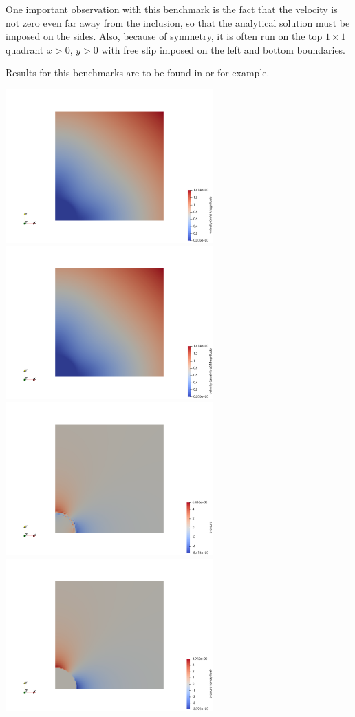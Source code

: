\documentclass[a4paper]{article}
\begin{document}
One important observation with this benchmark is the fact that the velocity is not zero even far 
away from the inclusion, so that the analytical solution must be imposed on the sides.
Also, because of symmetry, it is often run on the top $1\times 1$ quadrant $x>0$, $y>0$ with 
free slip imposed on the left and bottom boundaries.

Results for this benchmarks are to be found in \textcite{krhb12} or \textcite{gemd13} 
for example. 

\begin{center}
\includegraphics[width=8cm]{./results/benchmark_solvi/vel}
\includegraphics[width=8cm]{./results/benchmark_solvi/vel_analytical}\\
\includegraphics[width=8cm]{./results/benchmark_solvi/press}
\includegraphics[width=8cm]{./results/benchmark_solvi/press_analytical}\\

\end{center}
\end{document}
